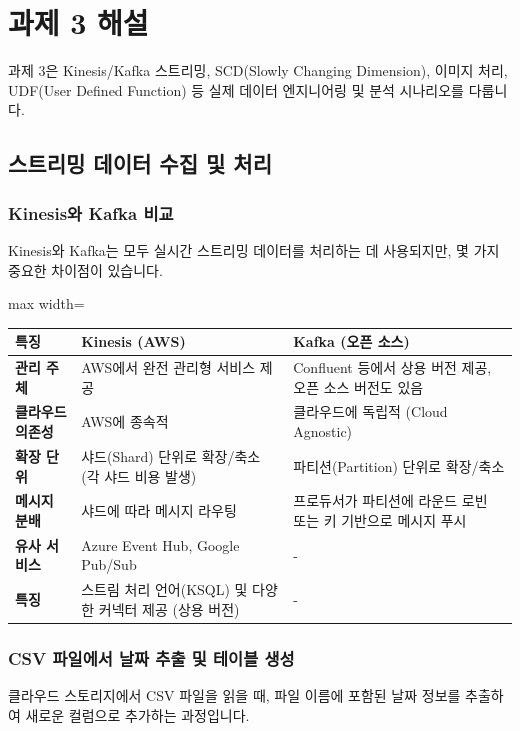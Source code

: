 \documentclass[11pt,a4paper]{article}
\theoremstyle{definition}
\begin{document}
\newpage
\section*{과제 3 해설}

과제 3은 Kinesis/Kafka 스트리밍, SCD(Slowly Changing Dimension), 이미지 처리, UDF(User Defined Function) 등 실제 데이터 엔지니어링 및 분석 시나리오를 다룹니다.

\subsection{스트리밍 데이터 수집 및 처리}

\subsubsection{Kinesis와 Kafka 비교}
Kinesis와 Kafka는 모두 실시간 스트리밍 데이터를 처리하는 데 사용되지만, 몇 가지 중요한 차이점이 있습니다.

\begin{adjustbox}{max width=\textwidth}
\begin{tabular}{lll}
\toprule
\textbf{특징} & \textbf{Kinesis (AWS)} & \textbf{Kafka (오픈 소스)} \\
\midrule
\textbf{관리 주체} & AWS에서 완전 관리형 서비스 제공 & Confluent 등에서 상용 버전 제공, 오픈 소스 버전도 있음 \\
\textbf{클라우드 의존성} & AWS에 종속적 & 클라우드에 독립적 (Cloud Agnostic) \\
\textbf{확장 단위} & 샤드(Shard) 단위로 확장/축소 (각 샤드 비용 발생) & 파티션(Partition) 단위로 확장/축소 \\
\textbf{메시지 분배} & 샤드에 따라 메시지 라우팅 & 프로듀서가 파티션에 라운드 로빈 또는 키 기반으로 메시지 푸시 \\
\textbf{유사 서비스} & Azure Event Hub, Google Pub/Sub & - \\
\textbf{특징} & 스트림 처리 언어(KSQL) 및 다양한 커넥터 제공 (상용 버전) & - \\
\bottomrule
\end{tabular}
\end{adjustbox}

\subsubsection{CSV 파일에서 날짜 추출 및 테이블 생성}
클라우드 스토리지에서 CSV 파일을 읽을 때, 파일 이름에 포함된 날짜 정보를 추출하여 새로운 컬럼으로 추가하는 과정입니다.
\end{document}
